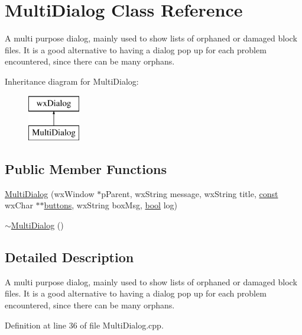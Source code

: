 \hypertarget{class_multi_dialog}{}\section{Multi\+Dialog Class Reference}
\label{class_multi_dialog}


A multi purpose dialog, mainly used to show lists of orphaned or damaged block files. It is a good alternative to having a dialog pop up for each problem encountered, since there can be many orphans.  


Inheritance diagram for Multi\+Dialog\+:\begin{figure}[H]
\begin{center}
\leavevmode
\includegraphics[height=2.000000cm]{class_multi_dialog}
\end{center}
\end{figure}
\subsection*{Public Member Functions}
\begin{DoxyCompactItemize}
\item 
\hyperlink{class_multi_dialog_add9c87292e9209bec4f9fe3c4177da1f}{Multi\+Dialog} (wx\+Window $\ast$p\+Parent, wx\+String message, wx\+String title, \hyperlink{getopt1_8c_a2c212835823e3c54a8ab6d95c652660e}{const} wx\+Char $\ast$$\ast$\hyperlink{winmain_8cpp_aa4250fecc19d9977f24b66fdac73f301}{buttons}, wx\+String box\+Msg, \hyperlink{mac_2config_2i386_2lib-src_2libsoxr_2soxr-config_8h_abb452686968e48b67397da5f97445f5b}{bool} log)
\item 
\hyperlink{class_multi_dialog_ac0ee98812e96106add8c9216d1fca9e7}{$\sim$\+Multi\+Dialog} ()
\end{DoxyCompactItemize}


\subsection{Detailed Description}
A multi purpose dialog, mainly used to show lists of orphaned or damaged block files. It is a good alternative to having a dialog pop up for each problem encountered, since there can be many orphans. 

Definition at line 36 of file Multi\+Dialog.\+cpp.



